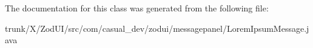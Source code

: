 The documentation for this class was generated from the following file\-:\begin{DoxyCompactItemize}
\item 
trunk/\-X/\-Zod\-U\-I/src/com/casual\-\_\-dev/zodui/messagepanel/Lorem\-Ipsum\-Message.\-java\end{DoxyCompactItemize}
